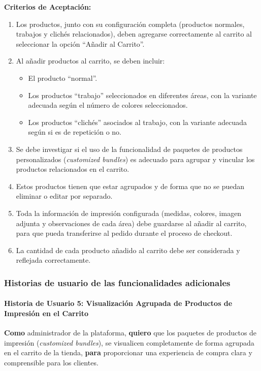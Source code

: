 \documentclass[12pt]{article}
\newcommand{\subsubsubsection}[1]{\paragraph{#1}}
\begin{document}
\vspace{0.5cm}
\textbf{Criterios de Aceptación:}
\begin{enumerate}[label=\arabic*.]
    \item Los productos, junto con su configuración completa (productos normales, trabajos y clichés relacionados), deben agregarse correctamente al carrito al seleccionar la opción ``Añadir al Carrito''.
    \item Al añadir productos al carrito, se deben incluir:
          \begin{itemize}
              \item El producto ``normal''.
              \item Los productos ``trabajo'' seleccionados en diferentes áreas, con la variante adecuada según el número de colores seleccionados.
              \item Los productos ``clichés'' asociados al trabajo, con la variante adecuada según si es de repetición o no.
          \end{itemize}
    \item Se debe investigar si el uso de la funcionalidad de paquetes de productos personalizados (\textit{customized bundles}) es adecuado para agrupar y vincular los productos relacionados en el carrito.
    \item Estos productos tienen que estar agrupados y de forma que no se puedan eliminar o editar por separado.
    \item Toda la información de impresión configurada (medidas, colores, imagen adjunta y observaciones de cada área) debe guardarse al añadir al carrito, para que pueda transferirse al pedido durante el proceso de checkout.
    \item La cantidad de cada producto añadido al carrito debe ser considerada y reflejada correctamente.
\end{enumerate}

\subsubsection{Historias de usuario de las funcionalidades adicionales}

\subsubsubsection{Historia de Usuario 5: Visualización Agrupada de Productos de Impresión en el Carrito}\label{sec:historia5}

\textbf{Como} administrador de la plataforma,
\textbf{quiero} que los paquetes de productos de impresión (\textit{customized bundles}), se visualicen completamente de forma agrupada en el carrito de la tienda,
\textbf{para} proporcionar una experiencia de compra clara y comprensible para los clientes.
\end{document}
